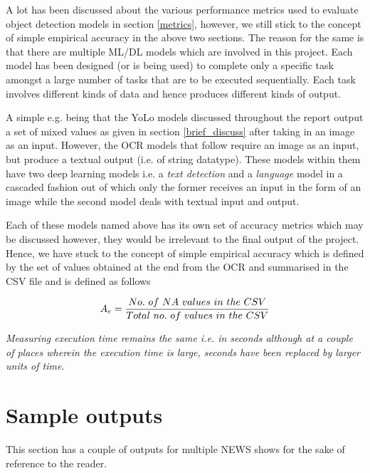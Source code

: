 A lot has been discussed about the various performance metrics used to evaluate object detection models in section \ref{metrics}, however, we still stick to the concept of simple empirical accuracy in the above two sections. The reason for the same is that there are multiple ML/DL models which are involved in this project. Each model has been designed (or is being used) to complete only a specific task amongst a large number of tasks that are to be executed sequentially. Each task involves different kinds of data and hence produces different kinds of output. \par

A simple e.g. being that the YoLo models discussed throughout the report output a set of mixed values as given in section \ref{brief_discuss} after taking in an image as an input. However, the OCR models that follow require an image as an input, but produce a textual output (i.e. of string datatype). These models within them have two deep learning models i.e. a \textit{text detection} and a \textit{language} model in a cascaded fashion out of which only the former receives an input in the form of an image while the second model deals with textual input and output. \par

Each of these models named above has its own set of accuracy metrics which may be discussed however, they would be irrelevant to the final output of the project. Hence, we have stuck to the concept of simple empirical accuracy which is defined by the set of values obtained at the end from the OCR and summarised in the CSV file and is defined as follows

\begin{equation}
\centering
A_{e} = \frac{No. \ of  \ NA \ values \ in \ the \ CSV}{Total \ no. \ of \ values \ in \ the \ CSV }

\end{equation}

\textit{Measuring execution time remains the same i.e. in seconds although at a couple of places wherein the execution time is large, seconds have been replaced by larger units of time}. \newpage

\section{Sample outputs}

This section has a couple of outputs for multiple NEWS shows for the sake of reference to the reader.

